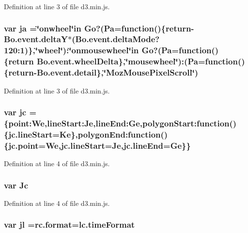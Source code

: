 Definition at line 3 of file d3.\+min.\+js.

\subsubsection[{ja}]{\setlength{\rightskip}{0pt plus 5cm}var ja =\char`\"{}onwheel\char`\"{}in {\bf Go}?({\bf Pa}=function()\{{\bf return}-\/Bo.\+event.\+delta\+Y$\ast$(Bo.\+event.\+delta\+Mode?120\+:1)\},\char`\"{}wheel\char`\"{})\+:\char`\"{}onmousewheel\char`\"{}in {\bf Go}?({\bf Pa}=function()\{{\bf return} Bo.\+event.\+wheel\+Delta\},\char`\"{}mousewheel\char`\"{})\+:(Pa=function()\{{\bf return}-\/Bo.\+event.\+detail\},\char`\"{}Moz\+Mouse\+Pixel\+Scroll\char`\"{})}\label{d3_8min_8js_ac05e198d292da145747723e865b2a478}


Definition at line 3 of file d3.\+min.\+js.

\subsubsection[{jc}]{\setlength{\rightskip}{0pt plus 5cm}var jc =\{point\+:\+We,line\+Start\+:\+Je,line\+End\+:\+Ge,polygon\+Start\+:function()\{jc.\+line\+Start=Ke\},polygon\+End\+:function()\{jc.\+point=We,jc.\+line\+Start=Je,jc.\+line\+End=Ge\}\}}\label{d3_8min_8js_ae1d844a91b34be568dc821362a34a94a}


Definition at line 4 of file d3.\+min.\+js.

\subsubsection[{Jc}]{\setlength{\rightskip}{0pt plus 5cm}var Jc}\label{d3_8min_8js_a648c844f16dc6935142776cc30f12e71}


Definition at line 4 of file d3.\+min.\+js.

\subsubsection[{jl}]{\setlength{\rightskip}{0pt plus 5cm}var jl ={\bf rc.\+format}=lc.\+time\+Format}\label{d3_8min_8js_ae3c3627d0b3fab1050af4a91a69dcb96}


